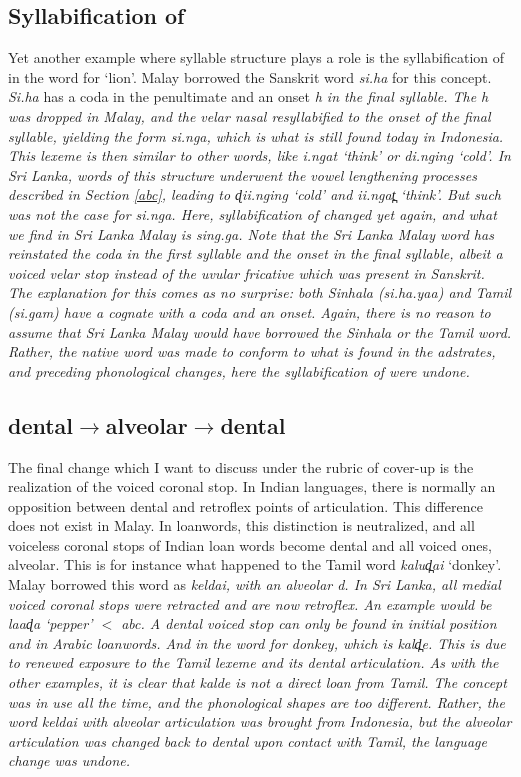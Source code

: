 \documentclass[a4paper,10pt]{article}
\newcommand{\trs}[2]{\textit{#1} `#2'}
\newcommand{\dz}{ɖ}
\newcommand{\dentt}{t̪}
\newcommand{\dentd}{d̪}
\begin{document}
\subsection{Syllabification of {\ng}} 
Yet another example where syllable structure plays a role is the syllabification of {\ng} in the word for `lion'. Malay borrowed the Sanskrit word {\em si{\ng}.ha} for this concept. {\em Si{\ng}.ha} has a coda {\ng} in the penultimate and an onset \em h \em in the final syllable. The h was dropped in Malay, and the velar nasal resyllabified to the onset of the final syllable, yielding the form \em si.nga\em, which is what is still found today in Indonesia. This lexeme is then similar to other words, like \trs{i.ngat}{think} or \trs{di.nging}{cold}. In Sri Lanka, words of this structure underwent the vowel lengthening processes described in Section \ref{abc}, leading to \trs{{\dz}ii.nging}{cold} and \trs{ii.nga{\dentt}}{think}. But such was not the case for \em si.nga\em. Here, syllabification of {\ng} changed yet again, and what we find in Sri Lanka Malay is \em sing.ga\em. Note that the Sri Lanka Malay word has reinstated the coda in the first syllable and the onset in the final syllable, albeit a voiced velar stop instead of the uvular fricative which was present in Sanskrit. The explanation for this comes as no surprise: both Sinhala ({\em si{\ng}.ha.yaa}) and Tamil ({\em si{\ng}.gam}) have a cognate with a coda and an onset. Again, there is no reason to assume that Sri Lanka Malay would have borrowed the Sinhala or the Tamil word. Rather, the native word was made to conform to what is found in the adstrates, and preceding phonological changes, here the syllabification of {\ng} were undone.

\subsection{dental$\to$alveolar$\to$dental} 
The final change which I want to discuss under the rubric of cover-up is the realization of the voiced coronal stop. In Indian languages, there is normally an opposition between dental and retroflex points of articulation. This difference does not exist in Malay. In loanwords, this distinction is neutralized, and all voiceless coronal stops of Indian loan words become dental and all voiced ones, alveolar. This is for instance what happened to the Tamil word \trs{kalu{\dentd}ai}{donkey}. Malay borrowed this word as \em keldai\em, with an alveolar d. In Sri Lanka, all medial voiced coronal stops were retracted and are now retroflex. An example would be \trs{laa{\dz}a}{pepper} $<$ \em abc\em. A dental voiced stop can only be found in initial position and in Arabic loanwords. And in the word for donkey, which is \em kal{\dentd}e\em. This is due to renewed exposure to the Tamil lexeme and its dental articulation. As with the other examples, it is clear that \em kalde \em is not a direct loan from Tamil. The concept was in use all the time, and the phonological shapes are too different. Rather, the word \em keldai \em with alveolar articulation was brought from Indonesia, but the alveolar articulation was changed back to dental upon contact with Tamil, the language change was undone. 
\end{document}
